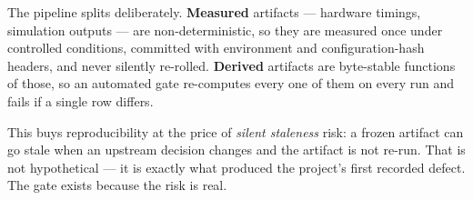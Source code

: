 The pipeline splits deliberately. \textbf{Measured} artifacts --- hardware timings, simulation
outputs --- are non-deterministic, so they are measured once under controlled conditions, committed
with environment and configuration-hash headers, and never silently re-rolled. \textbf{Derived}
artifacts are byte-stable functions of those, so an automated gate re-computes every one of them on
every run and fails if a single row differs.

This buys reproducibility at the price of \emph{silent staleness} risk: a frozen artifact can go
stale when an upstream decision changes and the artifact is not re-run. That is not hypothetical
--- it is exactly what produced the project's first recorded defect. The gate exists because the
risk is real.
